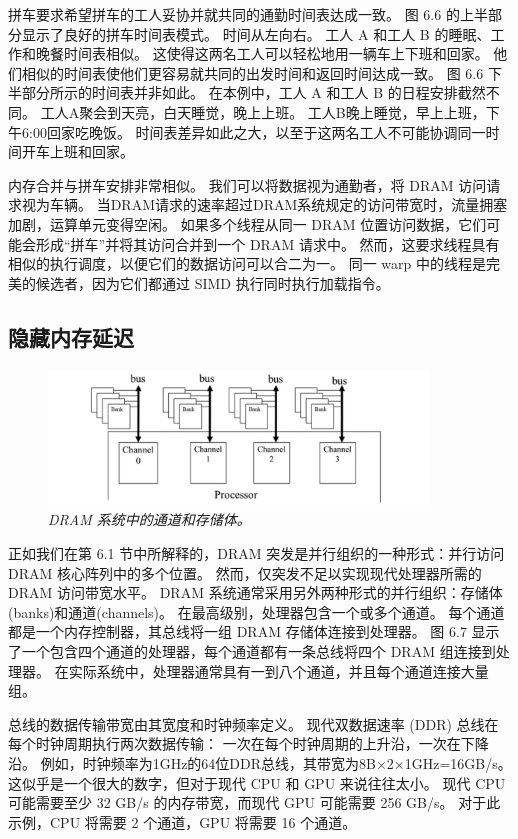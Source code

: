 拼车要求希望拼车的工人妥协并就共同的通勤时间表达成一致。 图 6.6 的上半部分显示了良好的拼车时间表模式。 
时间从左向右。 工人 A 和工人 B 的睡眠、工作和晚餐时间表相似。 这使得这两名工人可以轻松地用一辆车上下班和回家。 
他们相似的时间表使他们更容易就共同的出发时间和返回时间达成一致。 图 6.6 下半部分所示的时间表并非如此。 
在本例中，工人 A 和工人 B 的日程安排截然不同。 工人A聚会到天亮，白天睡觉，晚上上班。 
工人B晚上睡觉，早上上班，下午6:00回家吃晚饭。 时间表差异如此之大，以至于这两名工人不可能协调同一时间开车上班和回家。

内存合并与拼车安排非常相似。 我们可以将数据视为通勤者，将 DRAM 访问请求视为车辆。 
当DRAM请求的速率超过DRAM系统规定的访问带宽时，流量拥塞加剧，运算单元变得空闲。 
如果多个线程从同一 DRAM 位置访问数据，它们可能会形成“拼车”并将其访问合并到一个 DRAM 请求中。 
然而，这要求线程具有相似的执行调度，以便它们的数据访问可以合二为一。 
同一 warp 中的线程是完美的候选者，因为它们都通过 SIMD 执行同时执行加载指令。

\subsection{隐藏内存延迟}
\begin{figure}[H]
	\centering
	\includegraphics[width=0.9\textwidth]{figs/F6.7.png}
	\caption{\textit{DRAM 系统中的通道和存储体。}}
\end{figure}

正如我们在第 6.1 节中所解释的，DRAM 突发是并行组织的一种形式：并行访问 DRAM 核心阵列中的多个位置。 
然而，仅突发不足以实现现代处理器所需的 DRAM 访问带宽水平。 
DRAM 系统通常采用另外两种形式的并行组织：存储体(banks)和通道(channels)。 
在最高级别，处理器包含一个或多个通道。 每个通道都是一个内存控制器，其总线将一组 DRAM 存储体连接到处理器。 
图 6.7 显示了一个包含四个通道的处理器，每个通道都有一条总线将四个 DRAM 组连接到处理器。 
在实际系统中，处理器通常具有一到八个通道，并且每个通道连接大量组。

总线的数据传输带宽由其宽度和时钟频率定义。 现代双数据速率 (DDR) 总线在每个时钟周期执行两次数据传输：
一次在每个时钟周期的上升沿，一次在下降沿。 例如，时钟频率为1GHz的64位DDR总线，其带宽为8B×2×1GHz=16GB/s。 
这似乎是一个很大的数字，但对于现代 CPU 和 GPU 来说往往太小。 
现代 CPU 可能需要至少 32 GB/s 的内存带宽，而现代 GPU 可能需要 256 GB/s。 
对于此示例，CPU 将需要 2 个通道，GPU 将需要 16 个通道。

